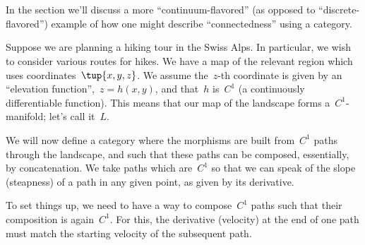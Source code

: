 
\section{ }
\label{sec:trekking}

In the section we'll discuss a more ``continuum-flavored'' (as opposed to ``discrete-flavored'') example of how one might describe ``connectedness'' using a category.

Suppose we are planning a hiking tour in the Swiss Alps. In particular, we wish to consider various routes for hikes. We have a map of the relevant region which uses coordinates~$\tup{x,y,z}$. We assume the~$z$-th coordinate is given by an ``elevation function'',~$z = h(x,y)$, and that~$h$ is~$C^1$ (a continuously differentiable function). This means that our map of the landscape forms a~$C^1$-manifold; let's call it~$L$.


We will now define a category where the morphisms are built from~$C^1$ paths through the landscape, and such that these paths can be composed, essentially, by concatenation. We take paths which are~$C^1$ so that we can speak of the slope (steapness) of a path in any given point, as given by its derivative.


To set things up, we need to have a way to compose~$C^1$ paths such that their composition is again~$C^1$. For this, the derivative (velocity) at the end of one path must match the starting velocity of the subsequent path.

